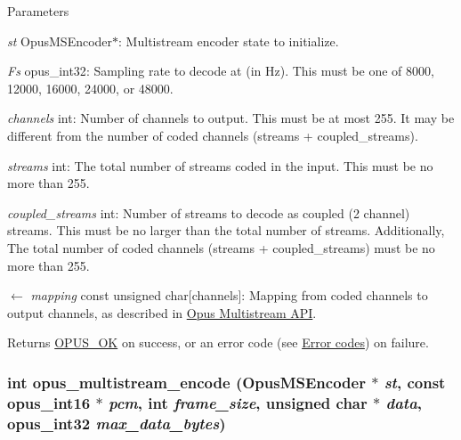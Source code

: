\begin{DoxyParams}{Parameters}
\item[{\em st}]{\ttfamily OpusMSEncoder$\ast$}: Multistream encoder state to initialize. \item[{\em Fs}]{\ttfamily opus\_\-int32}: Sampling rate to decode at (in Hz). This must be one of 8000, 12000, 16000, 24000, or 48000. \item[{\em channels}]{\ttfamily int}: Number of channels to output. This must be at most 255. It may be different from the number of coded channels ({\ttfamily streams + coupled\_\-streams}). \item[{\em streams}]{\ttfamily int}: The total number of streams coded in the input. This must be no more than 255. \item[{\em coupled\_\-streams}]{\ttfamily int}: Number of streams to decode as coupled (2 channel) streams. This must be no larger than the total number of streams. Additionally, The total number of coded channels ({\ttfamily streams + coupled\_\-streams}) must be no more than 255. \item[\mbox{$\leftarrow$} {\em mapping}]{\ttfamily const unsigned char\mbox{[}channels\mbox{]}}: Mapping from coded channels to output channels, as described in \hyperlink{group__opus__multistream}{Opus Multistream API}. \end{DoxyParams}
\begin{DoxyReturn}{Returns}
\hyperlink{group__opus__errorcodes_gaa44cf8a185e1b5cb940ef63eb4f02d21}{OPUS\_\-OK} on success, or an error code (see \hyperlink{group__opus__errorcodes}{Error codes}) on failure. 
\end{DoxyReturn}
\hypertarget{group__opus__multistream_ga9e1000f220d9872e9f3b6e4f2417b445}{
\subsubsection[{opus\_\-multistream\_\-encode}]{\setlength{\rightskip}{0pt plus 5cm}int opus\_\-multistream\_\-encode ({\bf OpusMSEncoder} $\ast$ {\em st}, \/  const {\bf opus\_\-int16} $\ast$ {\em pcm}, \/  int {\em frame\_\-size}, \/  unsigned char $\ast$ {\em data}, \/  {\bf opus\_\-int32} {\em max\_\-data\_\-bytes})}}
\label{group__opus__multistream_ga9e1000f220d9872e9f3b6e4f2417b445}


